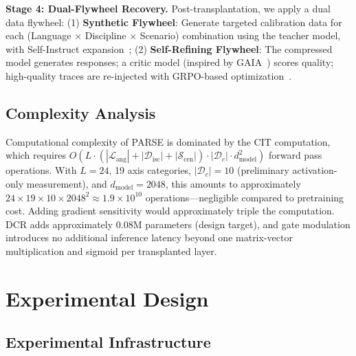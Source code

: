 \documentclass[twocolumn]{article}
\begin{document}
\textbf{Stage 4: Dual-Flywheel Recovery.}
Post-transplantation, we apply a dual data flywheel:
(1) \textbf{Synthetic Flywheel}: Generate targeted calibration data for each (Language $\times$ Discipline $\times$ Scenario) combination using the teacher model, with Self-Instruct expansion~\citep{lyu2026agenticqwen};
(2) \textbf{Self-Refining Flywheel}: The compressed model generates responses; a critic model (inspired by GAIA~\citep{wang2026gaia}) scores quality; high-quality traces are re-injected with GRPO-based optimization~\citep{shao2024deepseekmath,han2026ebpo,liu2026stapo}.

\subsection{Complexity Analysis}

Computational complexity of PARSE is dominated by the CIT computation, which requires $O(L \cdot (|\mathcal{L}_{\text{ang}}| + |\mathcal{D}_{\text{isc}}| + |\mathcal{S}_{\text{cen}}|) \cdot |\mathcal{D}_c| \cdot d_{\text{model}}^2)$ forward pass operations.
With $L=24$, 19 axis categories, $|\mathcal{D}_c|=10$ (preliminary activation-only measurement), and $d_{\text{model}}=2048$, this amounts to approximately $24 \times 19 \times 10 \times 2048^2 \approx 1.9 \times 10^{10}$ operations---negligible compared to pretraining cost.
Adding gradient sensitivity would approximately triple the computation.
DCR adds approximately 0.08M parameters (design target), and gate modulation introduces no additional inference latency beyond one matrix-vector multiplication and sigmoid per transplanted layer.

\section{Experimental Design}

\subsection{Experimental Infrastructure}
\end{document}
